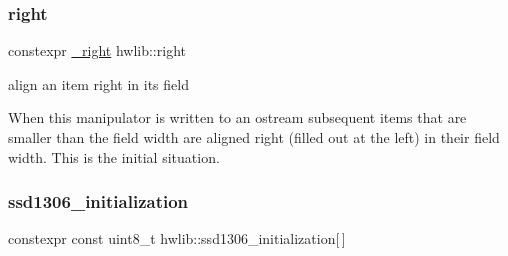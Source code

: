 \subsubsection{\texorpdfstring{right}{right}}
{\footnotesize\ttfamily constexpr \hyperlink{structhwlib_1_1__right}{\+\_\+right} hwlib\+::right}

align an item right in its field

When this manipulator is written to an ostream subsequent items that are smaller than the field width are aligned right (filled out at the left) in their field width. This is the initial situation. \mbox{\label{namespacehwlib_ab32aa8b496b969a1ae47bab09a2c2937}} 
\subsubsection{\texorpdfstring{ssd1306\+\_\+initialization}{ssd1306\_initialization}}
{\footnotesize\ttfamily constexpr const uint8\+\_\+t hwlib\+::ssd1306\+\_\+initialization\mbox{[}$\,$\mbox{]}}

